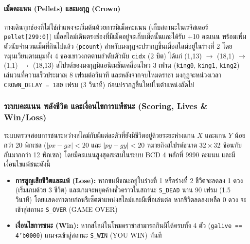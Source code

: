 \documentclass[12pt,a4paper]{article}
\begin{document}
\paragraph{เม็ดคะแนน (Pellets) และมงกุฎ (Crown)}
ทางเดินทุกช่องที่ไม่ใช่กำแพงจะเริ่มต้นด้วยการมีเม็ดคะแนน (เก็บสถานะในเรจิสเตอร์ \texttt{pellet[299:0]}) เมื่อสไลม์เดินตรงช่องที่มีเม็ดอยู่จะเก็บเม็ดนั้นและได้รับ +10 คะแนน พร้อมเพิ่มตัวนับจำนวนเม็ดที่กินไปแล้ว (\texttt{pcount}) สำหรับมงกุฎจะปรากฏขึ้นเมื่อสไลม์อยู่ในร่างที่ 2 โดยหมุนเวียนตามมุมทั้ง 4 ของเขาวงกตตามลำดับตัวนับ \texttt{cidx} (2 บิต) ได้แก่ (1,13) $\rightarrow$ (18,1) $\rightarrow$ (1,1) $\rightarrow$ (18,13) สไปรต์ของมงกุฎมีแอนิเมชันเคลื่อนไหว 3 เฟรม (\texttt{king0}, \texttt{king1}, \texttt{king2}) เล่นวนที่ความเร็วประมาณ 8 เฟรมต่อวินาที และหลังจากจบโหมดราชา มงกุฎจะหน่วงเวลา \texttt{CROWN\_DELAY = 180} เฟรม (3 วินาที) ก่อนปรากฏขึ้นใหม่ในตำแหน่งถัดไป

\subsubsection{ระบบคะแนน พลังชีวิต และเงื่อนไขการแพ้ชนะ (Scoring, Lives \& Win/Loss)}

ระบบตรวจสอบการชนระหว่างสไลม์กับผีแต่ละตัวที่ยังมีชีวิตอยู่ด้วยระยะห่างแกน $X$ และแกน $Y$ น้อยกว่า 20 พิกเซล ($|px - gx| < 20$ และ $|py - gy| < 20$ หมายถึงสไปรต์ขนาด $32\times32$ ซ้อนทับกันมากกว่า 12 พิกเซล) โดยมีคะแนนสูงสุดสะสมในระบบ BCD 4 หลักที่ 9990 คะแนน และมีเงื่อนไขแพ้ชนะดังนี้
\begin{itemize}[leftmargin=1.5cm]
    \item \textbf{การสูญเสียชีวิตและแพ้ (Lose):} หากชนผีขณะอยู่ในร่างที่ 1 หรือร่างที่ 2 ชีวิตจะลดลง 1 ดวง (เริ่มเกมด้วย 3 ชีวิต) และเกมจะหยุดค้างชั่วคราวในสถานะ \texttt{S\_DEAD} นาน 90 เฟรม (1.5 วินาที) โดยแสดงท่าตายก่อนรีเซ็ตตำแหน่งสไลม์และผีเพื่อเล่นต่อ หากชีวิตลดลงเหลือ 0 ดวง จะเข้าสู่สถานะ \texttt{S\_OVER} (GAME OVER)
    \item \textbf{เงื่อนไขการชนะ (Win):} หากสไลม์ในโหมดราชาสามารถกินผีได้ครบทั้ง 4 ตัว (\texttt{galive == 4'b0000}) เกมจะเข้าสู่สถานะ \texttt{S\_WIN} (YOU WIN) ทันที
\end{itemize}
\end{document}
